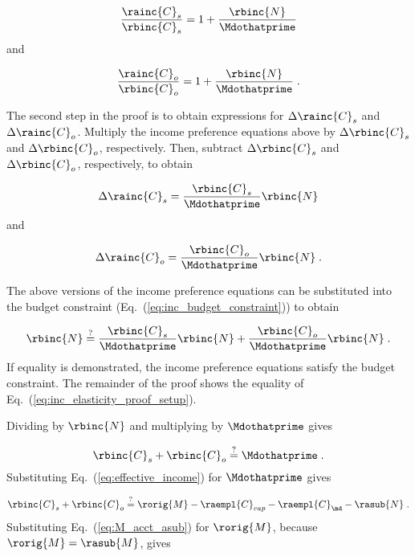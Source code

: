 \begin{equation}
    \frac{\rainc{C}_s}{\rbinc{C}_s} = 1 + \frac{\rbinc{N}}{\Mdothatprime}
\end{equation}
%
and

\begin{equation}
  \frac{\rainc{C}_o}{\rbinc{C}_o} = 1 + \frac{\rbinc{N}}{\Mdothatprime} \; .
\end{equation}
%

The second step in the proof is to obtain expressions 
for $\Delta \rainc{C}_s$ and $\Delta \rainc{C}_o$.
Multiply the income preference equations above
by $\Delta \rbinc{C}_s$ and $\Delta \rbinc{C}_o$, respectively.
Then, subtract $\Delta \rbinc{C}_s$ and $\Delta \rbinc{C}_o$, respectively, 
to obtain

\begin{equation}
  \Delta \rainc{C}_s = \frac{\rbinc{C}_s}{\Mdothatprime} \rbinc{N}
\end{equation}
%
and

\begin{equation}
  \Delta \rainc{C}_o = \frac{\rbinc{C}_o}{\Mdothatprime} \rbinc{N} \; .
\end{equation}

The above versions of the income preference equations 
can be substituted into the budget constraint
(Eq.~(\ref{eq:inc_budget_constraint})) to obtain

\begin{equation} \label{eq:inc_elasticity_proof_setup}
  \rbinc{N} \stackrel{?}{=} \frac{\rbinc{C}_s}{\Mdothatprime} \rbinc{N} 
                            + \frac{\rbinc{C}_o}{\Mdothatprime}  \rbinc{N} \; .
\end{equation}
%
If equality is demonstrated, 
the income preference equations satisfy the budget constraint.
The remainder of the proof shows the equality
of Eq.~(\ref{eq:inc_elasticity_proof_setup}).

Dividing by $\rbinc{N}$ and multiplying by $\Mdothatprime$ gives

\begin{equation}
  \rbinc{C}_s + \rbinc{C}_o \stackrel{?}{=} \Mdothatprime \; .
\end{equation}
%
Substituting Eq.~(\ref{eq:effective_income}) for $\Mdothatprime$ gives

\begin{equation}
  \rbinc{C}_s + \rbinc{C}_o \stackrel{?}{=} \rorig{M} - \raempl{C}_{cap} - \raempl{C}_{\md} - \rasub{N} \; .
\end{equation}
%
Substituting Eq.~(\ref{eq:M_acct_asub}) for $\rorig{M}$, 
because $\rorig{M} = \rasub{M}$, gives


